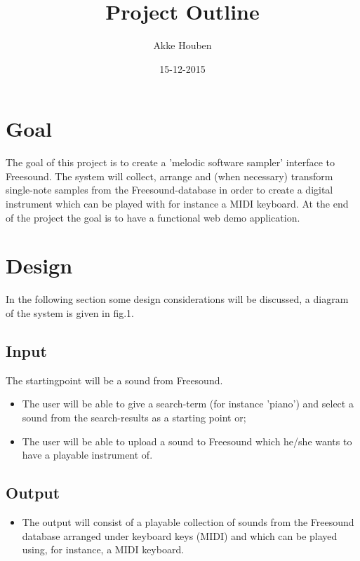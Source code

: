 \documentclass{article}
\title{Project Outline}
\author{Akke Houben}
\date{15-12-2015}
\begin{document}
\maketitle
\section{Goal}


The goal of this project is to create a 'melodic software sampler' interface to Freesound. The system will collect, arrange and (when necessary) transform single-note samples from the Freesound-database in order to create a digital instrument which can be played with for instance a MIDI keyboard. At the end of the project the goal is to have a functional web demo application.
\section{Design}
In the following section some design considerations will be discussed, a diagram of the system is given in fig.1.
\subsection{Input}
    The startingpoint will be a sound from Freesound.
    \begin{itemize}
        \item The user will be able to give a search-term (for instance 'piano') and select a sound from the search-results as a starting point or;
        \item The user will be able to upload a sound to Freesound which he/she wants to have a playable instrument of. 
    \end{itemize}

\subsection{Output}
    \begin{itemize}
        \item The output will consist of a playable collection of sounds from the Freesound database arranged under keyboard keys (MIDI) and which can be played using, for instance, a MIDI keyboard.
    \end{itemize}
\end{document}
